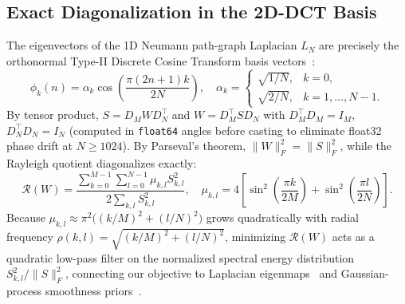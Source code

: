 \documentclass[11pt,a4paper]{article}
\begin{document}
\subsection{Exact Diagonalization in the 2D-DCT Basis}
The eigenvectors of the 1D Neumann path-graph Laplacian $L_N$ are precisely the orthonormal Type-II Discrete Cosine Transform basis vectors~\citep{strang1999dct}:
\begin{equation}
    \phi_k(n) = \alpha_k \cos\!\left(\frac{\pi (2n+1) k}{2N}\right), \quad \alpha_k = \begin{cases} \sqrt{1/N}, & k = 0, \\ \sqrt{2/N}, & k = 1, \dots, N-1. \end{cases}
    \label{eq:dct_basis}
\end{equation}
By tensor product, $S = D_M W D_N^\top$ and $W = D_M^\top S D_N$ with $D_M^\top D_M = I_M$, $D_N^\top D_N = I_N$ (computed in \texttt{float64} angles before casting to eliminate float32 phase drift at $N \ge 1024$). By Parseval's theorem, $\|W\|_F^2 = \|S\|_F^2$, while the Rayleigh quotient diagonalizes exactly:
\begin{equation}
    \mathcal{R}(W) = \frac{\sum_{k=0}^{M-1} \sum_{l=0}^{N-1} \mu_{k, l} S_{k, l}^2}{2 \sum_{k,l} S_{k,l}^2}, \quad \mu_{k, l} = 4 \left[ \sin^2\!\left(\frac{\pi k}{2M}\right) + \sin^2\!\left(\frac{\pi l}{2N}\right) \right].
    \label{eq:spectral_eigenvalues}
\end{equation}
Because $\mu_{k,l} \approx \pi^2 \big((k/M)^2 + (l/N)^2\big)$ grows quadratically with radial frequency $\rho(k,l) = \sqrt{(k/M)^2 + (l/N)^2}$, minimizing $\mathcal{R}(W)$ acts as a quadratic low-pass filter on the normalized spectral energy distribution $S_{k,l}^2 / \|S\|_F^2$, connecting our objective to Laplacian eigenmaps~\citep{belkin2003laplacian} and Gaussian-process smoothness priors~\citep{rasmussen2006gp}.
\end{document}
